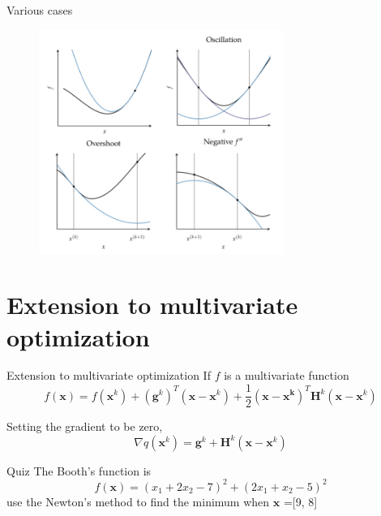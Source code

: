 \documentclass{beamer}
\begin{document}
\begin{frame}{Various cases}
\begin{figure}
\centering
\includegraphics[width=80mm]{Figs/newton-1d.jpeg}
\end{figure}    
    
\end{frame}


\section{Extension to multivariate optimization}
\begin{frame}{Extension to multivariate optimization}
If $f$ is a multivariate function
\begin{equation*}
    f(\boldsymbol{x}) = f(\boldsymbol{x}^k) + (\boldsymbol{g}^k)^T(\boldsymbol{x}-\boldsymbol{x}^k) 
    + \frac{1}{2} (\boldsymbol{x}-\boldsymbol{x^k})^T \boldsymbol{H}^k (\boldsymbol{x}-\boldsymbol{x}^k) 
\end{equation*}

Setting the gradient to be zero,
\begin{equation*}
    \nabla q(\boldsymbol{x}^k) = \boldsymbol{g}^k + \boldsymbol{H}^k (\boldsymbol{x}-\boldsymbol{x}^k)
\end{equation*}

\begin{alertblock}{Quiz}
The Booth's function is
\begin{equation*}
    f(\boldsymbol{x}) = (x_1 + 2x_2 -7)^2 + (2x_1 + x_2 -5)^2
\end{equation*}
use the Newton's method to find the minimum when $\boldsymbol{x}$ =[9, 8]


\end{alertblock}

\end{frame}
\end{document}

